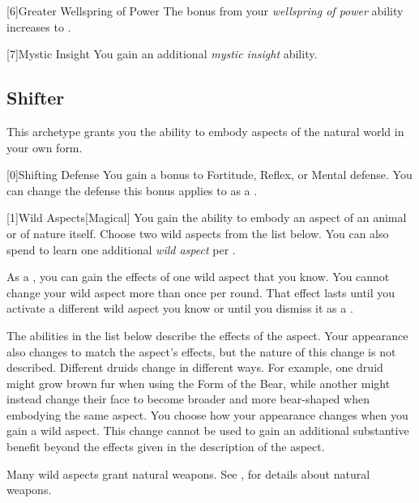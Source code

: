        [6]{Greater Wellspring of Power}
        The bonus from your \textit{wellspring of power} ability increases to .

        [7]{Mystic Insight}
        You gain an additional \textit{mystic insight} ability.

    \newpage
    \subsection{Shifter}\label{Shifter}
        This archetype grants you the ability to embody aspects of the natural world in your own form.

        [0]{Shifting Defense} You gain a  bonus to Fortitude, Reflex, or Mental defense.
        You can change the defense this bonus applies to as a .

        [1]{Wild Aspects}[Magical]
        You gain the ability to embody an aspect of an animal or of nature itself.
        Choose two wild aspects from the list below.
        You can also spend  to learn one additional \textit{wild aspect} per .

        As a , you can gain the effects of one wild aspect that you know.
        You cannot change your wild aspect more than once per round.
        That effect lasts until you activate a different wild aspect you know or until you dismiss it as a .

        The abilities in the list below describe the effects of the aspect.
        Your appearance also changes to match the aspect's effects, but the nature of this change is not described.
        Different druids change in different ways.
        For example, one druid might grow brown fur when using the Form of the Bear, while another might instead change their face to become broader and more bear-shaped when embodying the same aspect.
        You choose how your appearance changes when you gain a wild aspect.
        This change cannot be used to gain an additional substantive benefit beyond the effects given in the description of the aspect.

        Many wild aspects grant natural weapons.
        See , for details about natural weapons.

